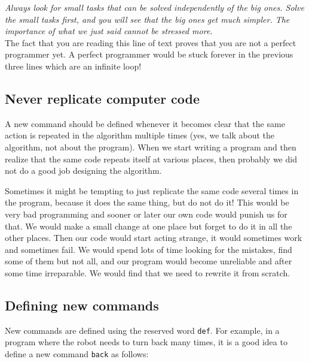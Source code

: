 {\em Always look for small tasks that can be solved independently of the big ones.
Solve the small tasks first, and you will see that the big ones get much simpler. The 
importance of what we just said cannot be stressed more.}\\

\noindent
The fact that you are reading this line of text proves that you are not 
a perfect programmer yet. A perfect programmer would be stuck forever 
in the previous three lines which are an infinite loop!


\subsection{Never replicate computer code}

A new command should be defined whenever it becomes clear that the same 
action is repeated in the algorithm multiple times (yes, we talk about the algorithm,
not about the program). When we start writing a program and then realize that the same
code repeats itself at various places, then probably we did not do a good job 
designing the algorithm.

Sometimes it might be 
tempting to just replicate the same code several times in the 
program, because it does the same thing, but do not do it! This would be very bad programming
and sooner or later our own code would punish us for that. 
We would make a small change at one place but forget to do it 
in all the other places. Then our code would start 
acting strange, it would sometimes work and sometimes fail. 
We would spend lots of time looking for the mistakes, find some 
of them but not all, and our program would become unreliable
and after some time irreparable. We would find that we need to 
rewrite it from scratch.

\subsection{Defining new commands}

New commands are defined using the reserved word 
{\tt def}. For example, in a program where the robot needs to turn back
many times, it is a good idea to define a new command {\tt back}
as follows:\\

